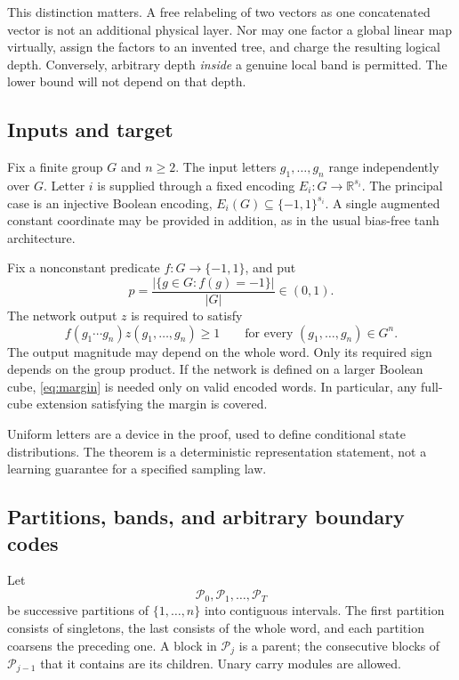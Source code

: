 \documentclass[11pt]{article}
\theoremstyle{remark}\newtheorem{remark}[theorem]{Remark}
\newcommand{\R}{\mathbb R}
\newcommand{\cP}{\mathcal P}
\begin{document}
This distinction matters. A free relabeling of two vectors as one concatenated
vector is not an additional physical layer. Nor may one factor a global linear
map virtually, assign the factors to an invented tree, and charge the resulting
logical depth. Conversely, arbitrary depth \emph{inside} a genuine local band
is permitted. The lower bound will not depend on that depth.

\subsection{Inputs and target}

Fix a finite group $G$ and $n\ge2$. The input letters $g_1,\ldots,g_n$
range independently over $G$. Letter $i$ is supplied through a fixed encoding
$E_i:G\to\R^{s_i}$. The principal case is an injective Boolean encoding,
$E_i(G)\subseteq\{-1,1\}^{s_i}$. A single augmented constant coordinate
may be provided in addition, as in the usual bias-free tanh architecture.

Fix a nonconstant predicate $f:G\to\{-1,1\}$, and put
\[
 p=\frac{|\{g\in G:f(g)=-1\}|}{|G|}\in(0,1).
\]
The network output $z$ is required to satisfy
\begin{equation}\label{eq:margin}
 f(g_1\cdots g_n)z(g_1,\ldots,g_n)\ge1
 \qquad\text{for every }(g_1,\ldots,g_n)\in G^n.
\end{equation}
The output magnitude may depend on the whole word. Only its required sign
depends on the group product. If the network is defined on a larger Boolean
cube, \eqref{eq:margin} is needed only on valid encoded words. In particular,
any full-cube extension satisfying the margin is covered.

Uniform letters are a device in the proof, used to define conditional state
distributions. The theorem is a deterministic representation statement, not
a learning guarantee for a specified sampling law.

\subsection{Partitions, bands, and arbitrary boundary codes}

Let
\[
 \cP_0,\cP_1,\ldots,\cP_T
\]
be successive partitions of $\{1,\ldots,n\}$ into contiguous intervals.
The first partition consists of singletons, the last consists of the whole
word, and each partition coarsens the preceding one. A block in $\cP_j$
is a parent; the consecutive blocks of $\cP_{j-1}$ that it contains are
its children. Unary carry modules are allowed.
\end{document}
